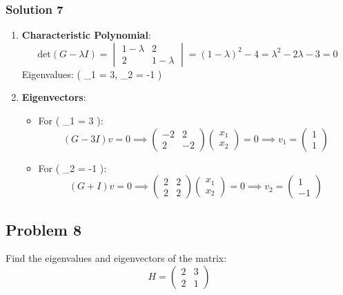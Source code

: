 \documentclass[
  letterpaper,
  DIV=11,
  numbers=noendperiod]{scrartcl}
\providecommand{\tightlist}{%
  \setlength{\itemsep}{0pt}\setlength{\parskip}{0pt}}\usepackage{longtable,booktabs,array}
\begin{document}
\subsubsection{Solution 7}\label{solution-7}

\begin{enumerate}
\def\labelenumi{\arabic{enumi}.}
\item
  \textbf{Characteristic Polynomial}: \[
  \text{det}(G - \lambda I) = \begin{vmatrix} 1 - \lambda & 2 \\ 2 & 1 - \lambda \end{vmatrix} = (1 - \lambda)^2 - 4 = \lambda^2 - 2\lambda - 3 = 0
  \] Eigenvalues: ( \lambda\_1 = 3, \lambda\_2 = -1 )
\item
  \textbf{Eigenvectors}:

  \begin{itemize}
  \tightlist
  \item
    For ( \lambda\_1 = 3 ): \[
    (G - 3I)v = 0 \implies \begin{pmatrix} -2 & 2 \\ 2 & -2 \end{pmatrix}\begin{pmatrix} x_1 \\ x_2 \end{pmatrix} = 0 \implies v_1 = \begin{pmatrix} 1 \\ 1 \end{pmatrix}
    \]
  \item
    For ( \lambda\_2 = -1 ): \[
    (G + I)v = 0 \implies \begin{pmatrix} 2 & 2 \\ 2 & 2 \end{pmatrix}\begin{pmatrix} x_1 \\ x_2 \end{pmatrix} = 0 \implies v_2 = \begin{pmatrix} 1 \\ -1 \end{pmatrix}
    \]
  \end{itemize}
\end{enumerate}

\subsection{Problem 8}\label{problem-8}

Find the eigenvalues and eigenvectors of the matrix: \[
H = \begin{pmatrix} 2 & 3 \\ 2 & 1 \end{pmatrix}
\]
\end{document}
